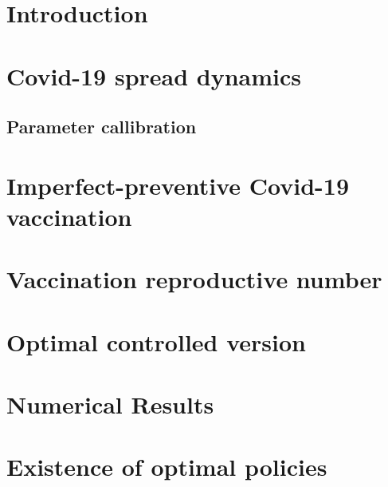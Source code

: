 \documentclass[sort&compress]{elsarticle}
\begin{document}
    
    \section{Introduction}
        
    \section{Covid-19 spread dynamics}
        
            \subsection{Parameter callibration}
            
    \section{Imperfect-preventive Covid-19 vaccination}
        
    \section{Vaccination reproductive number}
        
    \section{Optimal controlled version}
        
    \section{Numerical Results}
    \listofchanges[style=compactsummary]
    \appendix
  \section{Existence of optimal policies}
    
  
  
\end{document}
